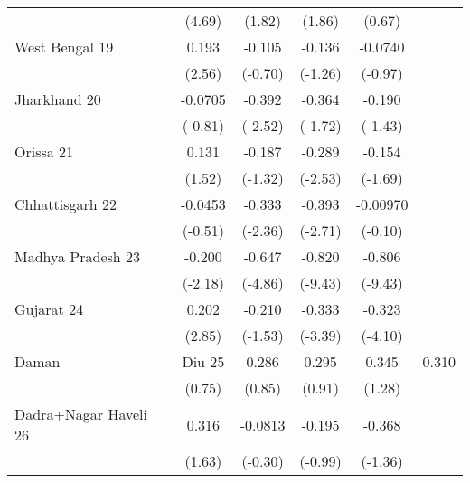 {\begin{tabular}{l*{4}{c}}
                    &      (4.69)         &      (1.82)         &      (1.86)         &      (0.67)         \\
[1em]
West Bengal 19      &       0.193\sym{*}  &      -0.105         &      -0.136         &     -0.0740         \\
                    &      (2.56)         &     (-0.70)         &     (-1.26)         &     (-0.97)         \\
[1em]
Jharkhand 20        &     -0.0705         &      -0.392\sym{*}  &      -0.364         &      -0.190         \\
                    &     (-0.81)         &     (-2.52)         &     (-1.72)         &     (-1.43)         \\
[1em]
Orissa 21           &       0.131         &      -0.187         &      -0.289\sym{*}  &      -0.154         \\
                    &      (1.52)         &     (-1.32)         &     (-2.53)         &     (-1.69)         \\
[1em]
Chhattisgarh 22     &     -0.0453         &      -0.333\sym{*}  &      -0.393\sym{**} &    -0.00970         \\
                    &     (-0.51)         &     (-2.36)         &     (-2.71)         &     (-0.10)         \\
[1em]
Madhya Pradesh 23   &      -0.200\sym{*}  &      -0.647\sym{***}&      -0.820\sym{***}&      -0.806\sym{***}\\
                    &     (-2.18)         &     (-4.86)         &     (-9.43)         &     (-9.43)         \\
[1em]
Gujarat 24          &       0.202\sym{**} &      -0.210         &      -0.333\sym{***}&      -0.323\sym{***}\\
                    &      (2.85)         &     (-1.53)         &     (-3.39)         &     (-4.10)         \\
[1em]
Daman & Diu 25      &       0.286         &       0.295         &       0.345         &       0.310         \\
                    &      (0.75)         &      (0.85)         &      (0.91)         &      (1.28)         \\
[1em]
Dadra+Nagar Haveli 26&       0.316         &     -0.0813         &      -0.195         &      -0.368         \\
                    &      (1.63)         &     (-0.30)         &     (-0.99)         &     (-1.36)         \\

\end{tabular}}
